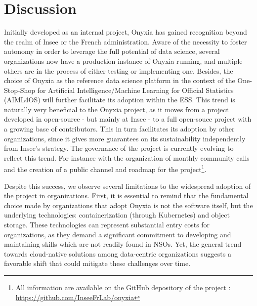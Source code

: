 \section{Discussion}


Initially developed as an internal project, Onyxia has gained recognition beyond the realm of Insee or the French administration. Aware of the necessity to foster autonomy in order to leverage the full potential of data science, several organizations now have a production instance of Onyxia running, and multiple others are in the process of either testing or implementing one. Besides, the choice of Onyxia as the reference data science platform in the context of the One-Stop-Shop for Artificial Intelligence/Machine Learning for Official Statistics (AIML4OS) will further facilitate its adoption within the ESS. This trend is naturally very beneficial to the Onyxia project, as it moves from a project developed in open-source - but mainly at Insee - to a full open-souce project with a growing base of contributors. This in turn facilitates its adoption by other organizations, since it gives more guarantees on its sustainability independently from Insee's strategy. The governance of the project is currently evolving to reflect this trend. For instance with the organization of monthly community calls and the creation of a public channel and roadmap for the project\footnote{All information are available on the GitHub depository of the project : \url{https://github.com/InseeFrLab/onyxia}}.

Despite this success, we observe several limitations to the widespread adoption of the project in organizations. First, it is essential to remind that the fundamental choice made by organizations that adopt Onyxia is not the software itself, but the underlying technologies: containerization (through Kubernetes) and object storage. These technologies can represent substantial entry costs for organizations, as they demand a significant commitment to developing and maintaining skills which are not readily found in NSOs. Yet, the general trend towards cloud-native solutions among data-centric organizations suggests a favorable shift that could mitigate these challenges over time.

